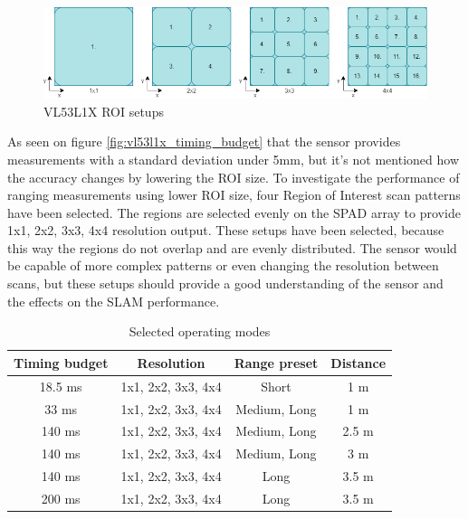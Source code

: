 \begin{figure}[!ht]
    \centering
    \includegraphics[width=150mm, keepaspectratio]{figures/vl53l1x_spad_arrays.png}
    \caption{VL53L1X ROI setups}
    \label{fig:vl53l1x_spad_arrays}
\end{figure}

As seen on figure \ref{fig:vl53l1x_timing_budget} that the sensor provides measurements with a standard deviation
under 5mm, but it's not mentioned how the accuracy changes by lowering the ROI size. To investigate the 
performance of ranging measurements using lower ROI size, four Region of Interest scan patterns have been selected.
The regions are selected evenly on the SPAD array to provide 1x1, 2x2, 3x3, 4x4 resolution output. These setups 
have been selected, because this way the regions do not overlap and are evenly distributed. The sensor would be
capable of more complex patterns or even changing the resolution between scans, but these setups should provide 
a good understanding of the sensor and the effects on the SLAM performance.

\begin{table}[ht]
	\centering
	\begin{tabular}{||c c c c||}
		\hline
        Timing budget       & Resolution        & Range preset      & Distance  \\
		\hline\hline
        18.5 ms      & 1x1, 2x2, 3x3, 4x4      & Short      & 1 m \\
		\hline
        33 ms        & 1x1, 2x2, 3x3, 4x4      & Medium, Long       & 1 m \\
		\hline
        140 ms       & 1x1, 2x2, 3x3, 4x4      & Medium, Long       & 2.5 m \\
		\hline
        140 ms       & 1x1, 2x2, 3x3, 4x4      & Medium, Long       & 3 m \\
		\hline
        140 ms       & 1x1, 2x2, 3x3, 4x4      & Long       & 3.5 m \\
		\hline
        200 ms       & 1x1, 2x2, 3x3, 4x4      & Long       & 3.5 m \\
		\hline
	\end{tabular}
	\caption{Selected operating modes}
	\label{tab:selected_operating_modes}
\end{table}

